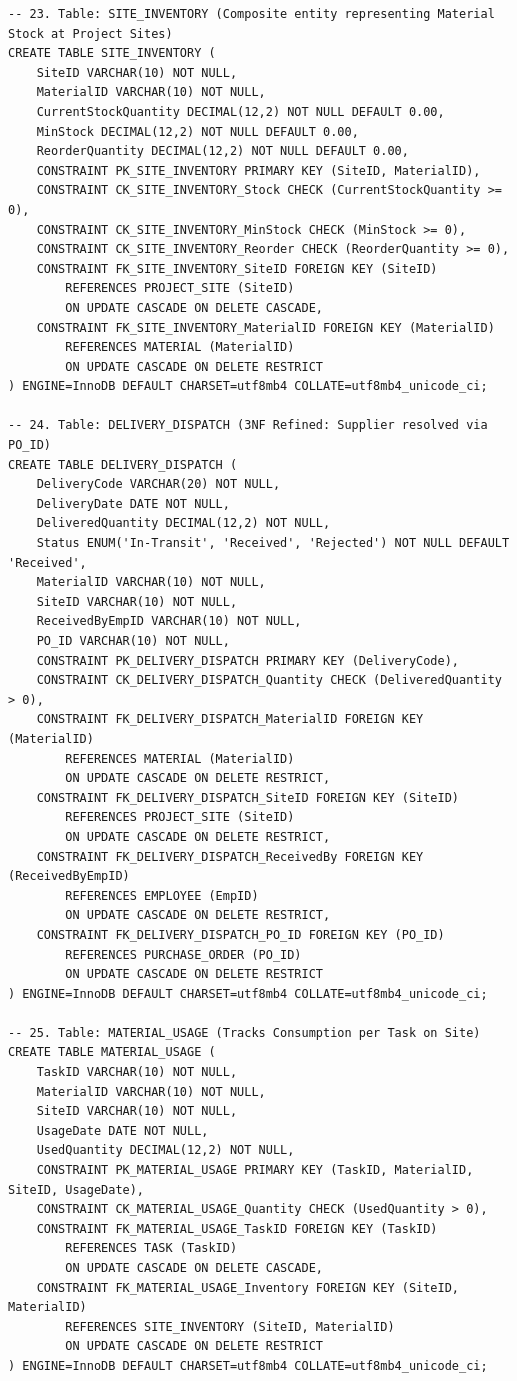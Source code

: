 \documentclass[a4paper,12pt]{report}
\begin{document}
\begin{lstlisting}
-- 23. Table: SITE_INVENTORY (Composite entity representing Material Stock at Project Sites)
CREATE TABLE SITE_INVENTORY (
    SiteID VARCHAR(10) NOT NULL,
    MaterialID VARCHAR(10) NOT NULL,
    CurrentStockQuantity DECIMAL(12,2) NOT NULL DEFAULT 0.00,
    MinStock DECIMAL(12,2) NOT NULL DEFAULT 0.00,
    ReorderQuantity DECIMAL(12,2) NOT NULL DEFAULT 0.00,
    CONSTRAINT PK_SITE_INVENTORY PRIMARY KEY (SiteID, MaterialID),
    CONSTRAINT CK_SITE_INVENTORY_Stock CHECK (CurrentStockQuantity >= 0),
    CONSTRAINT CK_SITE_INVENTORY_MinStock CHECK (MinStock >= 0),
    CONSTRAINT CK_SITE_INVENTORY_Reorder CHECK (ReorderQuantity >= 0),
    CONSTRAINT FK_SITE_INVENTORY_SiteID FOREIGN KEY (SiteID)
        REFERENCES PROJECT_SITE (SiteID)
        ON UPDATE CASCADE ON DELETE CASCADE,
    CONSTRAINT FK_SITE_INVENTORY_MaterialID FOREIGN KEY (MaterialID)
        REFERENCES MATERIAL (MaterialID)
        ON UPDATE CASCADE ON DELETE RESTRICT
) ENGINE=InnoDB DEFAULT CHARSET=utf8mb4 COLLATE=utf8mb4_unicode_ci;

-- 24. Table: DELIVERY_DISPATCH (3NF Refined: Supplier resolved via PO_ID)
CREATE TABLE DELIVERY_DISPATCH (
    DeliveryCode VARCHAR(20) NOT NULL,
    DeliveryDate DATE NOT NULL,
    DeliveredQuantity DECIMAL(12,2) NOT NULL,
    Status ENUM('In-Transit', 'Received', 'Rejected') NOT NULL DEFAULT 'Received',
    MaterialID VARCHAR(10) NOT NULL,
    SiteID VARCHAR(10) NOT NULL,
    ReceivedByEmpID VARCHAR(10) NOT NULL,
    PO_ID VARCHAR(10) NOT NULL,
    CONSTRAINT PK_DELIVERY_DISPATCH PRIMARY KEY (DeliveryCode),
    CONSTRAINT CK_DELIVERY_DISPATCH_Quantity CHECK (DeliveredQuantity > 0),
    CONSTRAINT FK_DELIVERY_DISPATCH_MaterialID FOREIGN KEY (MaterialID)
        REFERENCES MATERIAL (MaterialID)
        ON UPDATE CASCADE ON DELETE RESTRICT,
    CONSTRAINT FK_DELIVERY_DISPATCH_SiteID FOREIGN KEY (SiteID)
        REFERENCES PROJECT_SITE (SiteID)
        ON UPDATE CASCADE ON DELETE RESTRICT,
    CONSTRAINT FK_DELIVERY_DISPATCH_ReceivedBy FOREIGN KEY (ReceivedByEmpID)
        REFERENCES EMPLOYEE (EmpID)
        ON UPDATE CASCADE ON DELETE RESTRICT,
    CONSTRAINT FK_DELIVERY_DISPATCH_PO_ID FOREIGN KEY (PO_ID)
        REFERENCES PURCHASE_ORDER (PO_ID)
        ON UPDATE CASCADE ON DELETE RESTRICT
) ENGINE=InnoDB DEFAULT CHARSET=utf8mb4 COLLATE=utf8mb4_unicode_ci;

-- 25. Table: MATERIAL_USAGE (Tracks Consumption per Task on Site)
CREATE TABLE MATERIAL_USAGE (
    TaskID VARCHAR(10) NOT NULL,
    MaterialID VARCHAR(10) NOT NULL,
    SiteID VARCHAR(10) NOT NULL,
    UsageDate DATE NOT NULL,
    UsedQuantity DECIMAL(12,2) NOT NULL,
    CONSTRAINT PK_MATERIAL_USAGE PRIMARY KEY (TaskID, MaterialID, SiteID, UsageDate),
    CONSTRAINT CK_MATERIAL_USAGE_Quantity CHECK (UsedQuantity > 0),
    CONSTRAINT FK_MATERIAL_USAGE_TaskID FOREIGN KEY (TaskID)
        REFERENCES TASK (TaskID)
        ON UPDATE CASCADE ON DELETE CASCADE,
    CONSTRAINT FK_MATERIAL_USAGE_Inventory FOREIGN KEY (SiteID, MaterialID)
        REFERENCES SITE_INVENTORY (SiteID, MaterialID)
        ON UPDATE CASCADE ON DELETE RESTRICT
) ENGINE=InnoDB DEFAULT CHARSET=utf8mb4 COLLATE=utf8mb4_unicode_ci;


\end{lstlisting}
\end{document}
